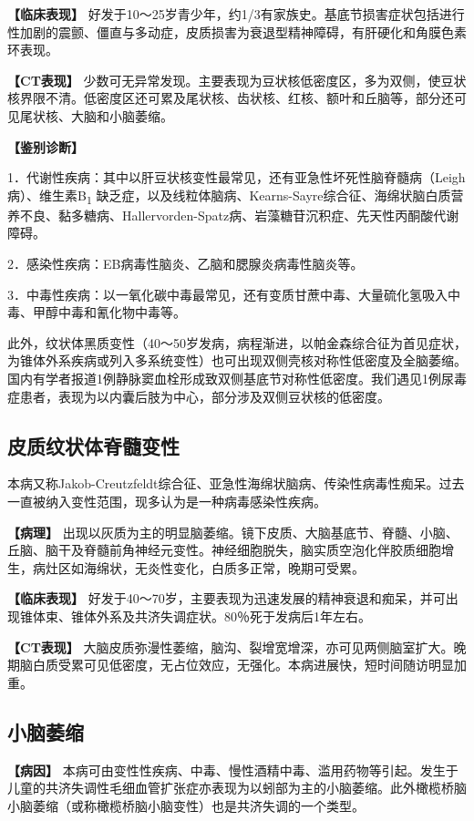 \textbf{【临床表现】}
好发于10～25岁青少年，约1/3有家族史。基底节损害症状包括进行性加剧的震颤、僵直与多动症，皮质损害为衰退型精神障碍，有肝硬化和角膜色素环表现。

\textbf{【CT表现】}
少数可无异常发现。主要表现为豆状核低密度区，多为双侧，使豆状核界限不清。低密度区还可累及尾状核、齿状核、红核、额叶和丘脑等，部分还可见尾状核、大脑和小脑萎缩。

\textbf{【鉴别诊断】}

1．代谢性疾病：其中以肝豆状核变性最常见，还有亚急性坏死性脑脊髓病（Leigh病）、维生素B\textsubscript{1}
缺乏症，以及线粒体脑病、Kearns-Sayre综合征、海绵状脑白质营养不良、黏多糖病、Hallervorden-Spatz病、岩藻糖苷沉积症、先天性丙酮酸代谢障碍。

2．感染性疾病：EB病毒性脑炎、乙脑和腮腺炎病毒性脑炎等。

3．中毒性疾病：以一氧化碳中毒最常见，还有变质甘蔗中毒、大量硫化氢吸入中毒、甲醇中毒和氰化物中毒等。

此外，纹状体黑质变性（40～50岁发病，病程渐进，以帕金森综合征为首见症状，为锥体外系疾病或列入多系统变性）也可出现双侧壳核对称性低密度及全脑萎缩。国内有学者报道1例静脉窦血栓形成致双侧基底节对称性低密度。我们遇见1例尿毒症患者，表现为以内囊后肢为中心，部分涉及双侧豆状核的低密度。

\subsection{皮质纹状体脊髓变性}

本病又称Jakob-Creutzfeldt综合征、亚急性海绵状脑病、传染性病毒性痴呆。过去一直被纳入变性范围，现多认为是一种病毒感染性疾病。

\textbf{【病理】}
出现以灰质为主的明显脑萎缩。镜下皮质、大脑基底节、脊髓、小脑、丘脑、脑干及脊髓前角神经元变性。神经细胞脱失，脑实质空泡化伴胶质细胞增生，病灶区如海绵状，无炎性变化，白质多正常，晚期可受累。

\textbf{【临床表现】}
好发于40～70岁，主要表现为迅速发展的精神衰退和痴呆，并可出现锥体束、锥体外系及共济失调症状。80％死于发病后1年左右。

\textbf{【CT表现】}
大脑皮质弥漫性萎缩，脑沟、裂增宽增深，亦可见两侧脑室扩大。晚期脑白质受累可见低密度，无占位效应，无强化。本病进展快，短时间随访明显加重。

\subsection{小脑萎缩}

\textbf{【病因】}
本病可由变性性疾病、中毒、慢性酒精中毒、滥用药物等引起。发生于儿童的共济失调性毛细血管扩张症亦表现为以蚓部为主的小脑萎缩。此外橄榄桥脑小脑萎缩（或称橄榄桥脑小脑变性）也是共济失调的一个类型。

